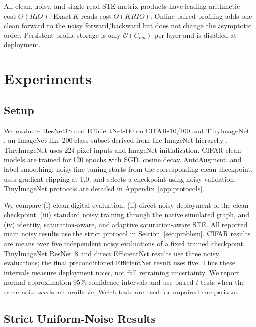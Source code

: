 \documentclass[10pt,twocolumn,letterpaper]{article}
\begin{document}
All clean, noisy, and single-read STE matrix products have leading arithmetic
cost $\Theta(RIO)$.  Exact $K$ reads cost $\Theta(KRIO)$.  Online paired
profiling adds one clean forward to the noisy forward/backward but does not
change the asymptotic order.  Persistent profile storage is only
$\mathcal{O}(C_{out})$ per layer and is disabled at deployment.

\section{Experiments}
\label{sec:experiments}

\subsection{Setup}

We evaluate ResNet18 \citep{he2016resnet} and EfficientNet-B0
\citep{tan2019efficientnet} on CIFAR-10/100 \citep{krizhevsky2009cifar} and
TinyImageNet \citep{le2015tinyimagenet}, an ImageNet-like 200-class subset
derived from the ImageNet hierarchy \citep{deng2009imagenet}.  TinyImageNet
uses 224-pixel inputs and ImageNet initialization.  CIFAR clean models are
trained for 120 epochs with SGD, cosine decay, AutoAugment, and label smoothing;
noisy fine-tuning starts from the corresponding clean checkpoint, uses gradient
clipping at 1.0, and selects a checkpoint using noisy validation.  TinyImageNet
protocols are detailed in Appendix~\ref{app:protocols}.

We compare (i) clean digital evaluation, (ii) direct noisy deployment of the
clean checkpoint, (iii) standard noisy training through the native simulated
graph, and (iv) identity, saturation-aware, and adaptive saturation-aware STE.
All reported main noisy results use the strict protocol in
Section~\ref{sec:problem}.  CIFAR results are means over five independent noisy
evaluations of a fixed trained checkpoint.  TinyImageNet ResNet18 and direct
EfficientNet results use three noisy evaluations; the final preconditioned
EfficientNet result uses five.  Thus these intervals measure deployment noise,
not full retraining uncertainty.  We report normal-approximation 95\% confidence
intervals and use paired $t$-tests when the same noise seeds are available;
Welch tests are used for unpaired comparisons \citep{welch1947ttest}.

\subsection{Strict Uniform-Noise Results}
\label{sec:main_results}
\end{document}
